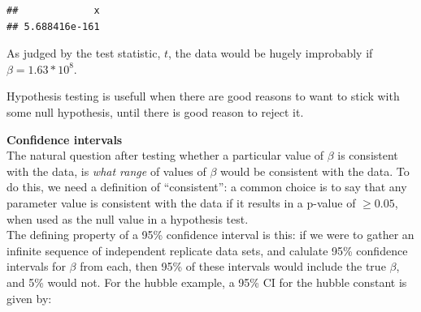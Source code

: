 \documentclass[
]{article}
\newenvironment{Shaded}{\begin{snugshade}}{\end{snugshade}}
\newcommand{\CommentTok}[1]{\textcolor[rgb]{0.56,0.35,0.01}{\textit{#1}}}
\newcommand{\DataTypeTok}[1]{\textcolor[rgb]{0.13,0.29,0.53}{#1}}
\newcommand{\DecValTok}[1]{\textcolor[rgb]{0.00,0.00,0.81}{#1}}
\newcommand{\FloatTok}[1]{\textcolor[rgb]{0.00,0.00,0.81}{#1}}
\newcommand{\KeywordTok}[1]{\textcolor[rgb]{0.13,0.29,0.53}{\textbf{#1}}}
\newcommand{\NormalTok}[1]{#1}
\newcommand{\OperatorTok}[1]{\textcolor[rgb]{0.81,0.36,0.00}{\textbf{#1}}}
\newcommand{\StringTok}[1]{\textcolor[rgb]{0.31,0.60,0.02}{#1}}
\begin{document}
\begin{Shaded}
\end{Shaded}

\begin{verbatim}
##             x 
## 5.688416e-161
\end{verbatim}

As judged by the test statistic, \(t\), the data would be hugely
improbably if \(\beta = 1.63*10^8\).

Hypothesis testing is usefull when there are good reasons to want to
stick with some null hypothesis, until there is good reason to reject
it.

\textbf{Confidence intervals}\\
The natural question after testing whether a particular value of
\(\beta\) is consistent with the data, is \emph{what range} of values of
\(\beta\) would be consistent with the data. To do this, we need a
definition of ``consistent'': a common choice is to say that any
parameter value is consistent with the data if it results in a p-value
of \(\ge 0.05\), when used as the null value in a hypothesis test.\\
The defining property of a 95\% confidence interval is this: if we were
to gather an infinite sequence of independent replicate data sets, and
calulate 95\% confidence intervals for \(\beta\) from each, then 95\% of
these intervals would include the true \(\beta\), and 5\% would not. For
the hubble example, a 95\% CI for the hubble constant is given by:

\begin{Shaded}
\end{Shaded}
\end{document}
